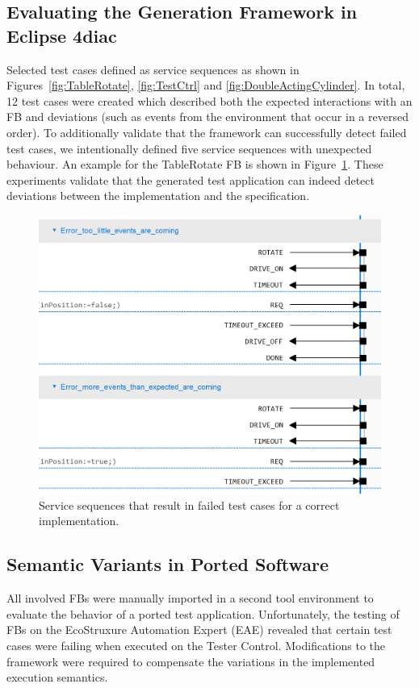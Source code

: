 \begin{bibunit}
\subsection{Evaluating the Generation Framework in Eclipse 4diac}
Selected test cases defined as service sequences as shown in Figures~\ref{fig:TableRotate}, \ref{fig:TestCtrl} and \ref{fig:DoubleActingCylinder}. In total, 12 test cases were created which described both the expected interactions with an FB and deviations (such as events from the environment that occur in a reversed order). To additionally validate that the framework can successfully detect failed test cases, we intentionally defined five service sequences with unexpected behaviour. An example for the TableRotate FB is shown in Figure~\ref{fig:table_rotate_fail}. These experiments validate that the generated test application can indeed detect deviations between the implementation and the specification.

\begin{figure}[!htbp]
    \centering
    \includegraphics[width=0.7\linewidth]{MX_Papers/Paper10/Figures/tests_casestudy/Service-TableRotate_negative.png}
    \caption{Service sequences that result in failed test cases for a correct implementation.}
    \label{fig:table_rotate_fail}
\end{figure}

\subsection{Semantic Variants in Ported Software}
All involved FBs were manually imported in a second tool environment to evaluate the behavior of a ported test application. Unfortunately, the testing of FBs on the EcoStruxure Automation Expert (EAE) revealed that certain test cases were failing when executed on the Tester Control. Modifications to the framework were required to compensate the variations in the implemented execution semantics.


\end{bibunit}
